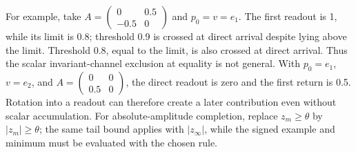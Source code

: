 For example, take $A=\left(\begin{smallmatrix}0&0.5\\-0.5&0\end{smallmatrix}\right)$ and $p_0=v=e_1$. The first readout is 1, while its limit is 0.8; threshold 0.9 is crossed at direct arrival despite lying above the limit. Threshold 0.8, equal to the limit, is also crossed at direct arrival. Thus the scalar invariant-channel exclusion at equality is not general. With $p_0=e_1$, $v=e_2$, and $A=\left(\begin{smallmatrix}0&0\\0.5&0\end{smallmatrix}\right)$, the direct readout is zero and the first return is 0.5. Rotation into a readout can therefore create a later contribution even without scalar accumulation. For absolute-amplitude completion, replace $z_m\ge\theta$ by $|z_m|\ge\theta$; the same tail bound applies with $|z_\infty|$, while the signed example and minimum must be evaluated with the chosen rule.
